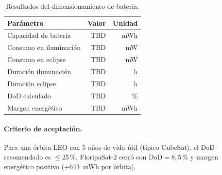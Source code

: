 \begin{table}[h]
\centering
\caption{Resultados del dimensionamiento de batería.}
\label{tab:battery_sizing}
\begin{tabular}{lrr}
\toprule
\textbf{Parámetro} & \textbf{Valor} & \textbf{Unidad} \\
\midrule
Capacidad de batería                 & TBD & mWh \\
Consumo en iluminación               & TBD & mW \\
Consumo en eclipse                   & TBD & mW \\
Duración iluminación                 & TBD & h \\
Duración eclipse                     & TBD & h \\
DoD calculado                        & TBD & \% \\
Margen energético                    & TBD & mWh \\
\bottomrule
\end{tabular}
\end{table}

\paragraph{Criterio de aceptación.}
Para una órbita LEO con 5 años de vida útil (típico CubeSat), el DoD recomendado es
$\le 25\,\%$. FloripaSat-2 cerró con DoD$=8{,}5\,\%$ y margen energético positivo (+643~mWh por órbita).
